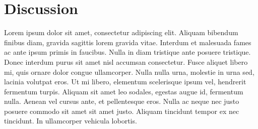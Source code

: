 \documentclass[10pt,letterpaper,twocolumn]{article}
\begin{document}
\section*{Discussion}

Lorem ipsum dolor sit amet, consectetur adipiscing elit. Aliquam bibendum
finibus diam, gravida sagittis lorem gravida vitae. Interdum et malesuada fames
ac ante ipsum primis in faucibus. Nulla in diam tristique ante posuere
tristique. Donec interdum purus sit amet nisl accumsan consectetur. Fusce
aliquet libero mi, quis ornare dolor congue ullamcorper. Nulla nulla urna,
molestie in urna sed, lacinia volutpat eros. Ut mi libero, elementum scelerisque
ipsum vel, hendrerit fermentum turpis. Aliquam sit amet leo sodales, egestas
augue id, fermentum nulla. Aenean vel cursus ante, et pellentesque eros. Nulla
ac neque nec justo posuere commodo sit amet sit amet justo. Aliquam tincidunt
tempor ex nec tincidunt. In ullamcorper vehicula lobortis.


{}
\end{document}
